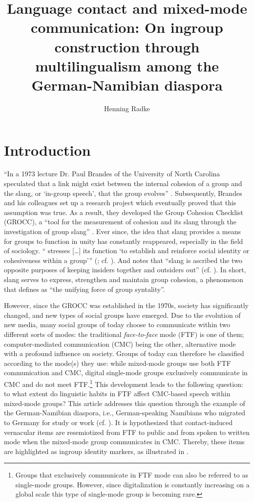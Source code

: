 \documentclass[output=paper]{langsci/langscibook}
\author{Henning Radke\affiliation{Universiteit van Amsterdam}}
\title[Language contact and mixed-mode communication]
      {Language contact and mixed-mode communication: On ingroup construction through multilingualism among the German-Namibian diaspora}
\begin{document}
\maketitle 


 
\section{Introduction}
\label{sec:radke:1}

“In a 1973 lecture Dr. Paul Brandes of the University of North Carolina speculated that a link might exist between the internal cohesion of a group and the slang, or ‘in-group speech’, that the group evolves” \citep[55]{weinberg_measurement_1979}. Subsequently, Brandes and his colleagues set up a research project which eventually proved that this assumption was true. As a result, they developed the Group Cohesion Checklist (GROCC), a “tool for the measurement of cohesion and its slang through the investigation of group slang” \citep[55]{weinberg_measurement_1979}. Ever since, the idea that slang provides a means for groups to function in unity has constantly reappeared, especially in the field of sociology. “\citet{eble_slang_1996} stresses […] its function ‘to establish and reinforce social identity or cohesiveness within a group’” (\citealt[4]{fasola_slang_2011}; cf. \citealt[11]{eble_slang_1996}). And \citet[32]{mattiello_introduction_2008} notes that “slang is ascribed the two opposite purposes of keeping insiders together and outsiders out” (cf. \citealt[4]{fasola_slang_2011}). In short, slang serves to express, strengthen and maintain group cohesion, a phenomenon that \citet[55]{weinberg_measurement_1979} defines as “the unifying force of group syntality”.

However, since the GROCC was established in the 1970s, society has significantly changed, and new types of social groups have emerged. Due to the evolution of new media, many social groups of today choose to communicate within two different sorts of modes: the traditional \textit{face-to-face} mode (FTF) is one of them; computer-mediated communication (CMC) being the other, alternative mode with a profound influence on society. Groups of today can therefore be classified according to the mode(s) they use: while mixed-mode groups use both FTF communication and CMC, digital single-mode groups exclusively communicate in CMC and do not meet FTF.\footnote{Groups that exclusively communicate in FTF mode can also be referred to as single-mode groups. However, since digitalization is constantly increasing on a global scale this type of single-mode group is becoming rare.} This development leads to the following question: to what extent do linguistic habits in FTF affect CMC-based speech within mixed-mode groups? This article addresses this question through the example of the German-Namibian diaspora, i.e., German-speaking Namibians who migrated to Germany for study or work (cf. \citealt{radke_urban_inpress}). It is hypothesized that contact-induced vernacular items are resemiotized from FTF to public and from spoken to written mode when the mixed-mode group communicates in CMC. Thereby, these items are highlighted as ingroup identity markers, as illustrated in .
 
\end{document}
